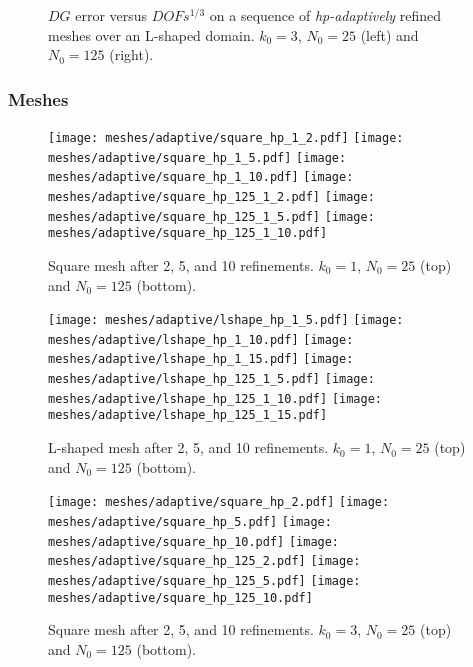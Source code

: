 \begin{figure}[!ht]
    \begin{subfigure}[b]{0.45\textwidth}
		
	\end{subfigure}
	\hfill
	\begin{subfigure}[b]{0.45\textwidth}
		
	\end{subfigure}
    \caption{$DG$ error versus $DOFs^{1/3}$ on a sequence of \textit{hp-adaptively} refined meshes over an L-shaped domain. $k_0 = 3$, $N_0 = 25$ (left) and $N_0 = 125$ (right).}
\end{figure}

\newpage
\subsubsection{Meshes}

\begin{figure}[!ht]
	\centering
    \texttt{[image: meshes/adaptive/square\_hp\_1\_2.pdf]}
	\texttt{[image: meshes/adaptive/square\_hp\_1\_5.pdf]}
	\texttt{[image: meshes/adaptive/square\_hp\_1\_10.pdf]}
    \texttt{[image: meshes/adaptive/square\_hp\_125\_1\_2.pdf]}
	\texttt{[image: meshes/adaptive/square\_hp\_125\_1\_5.pdf]}
	\texttt{[image: meshes/adaptive/square\_hp\_125\_1\_10.pdf]}
    \caption{Square mesh after 2, 5, and 10 refinements. $k_0 = 1$, $N_0 = 25$ (top) and $N_0 = 125$ (bottom).}
\end{figure}

\begin{figure}[!ht]
	\centering
	\texttt{[image: meshes/adaptive/lshape\_hp\_1\_5.pdf]}
	\texttt{[image: meshes/adaptive/lshape\_hp\_1\_10.pdf]}
	\texttt{[image: meshes/adaptive/lshape\_hp\_1\_15.pdf]}
    \texttt{[image: meshes/adaptive/lshape\_hp\_125\_1\_5.pdf]}
	\texttt{[image: meshes/adaptive/lshape\_hp\_125\_1\_10.pdf]}
	\texttt{[image: meshes/adaptive/lshape\_hp\_125\_1\_15.pdf]}
    \caption{L-shaped mesh after 2, 5, and 10 refinements. $k_0 = 1$, $N_0 = 25$ (top) and $N_0 = 125$ (bottom).}
\end{figure}

\newpage

\begin{figure}[!ht]
	\centering
    \texttt{[image: meshes/adaptive/square\_hp\_2.pdf]}
	\texttt{[image: meshes/adaptive/square\_hp\_5.pdf]}
	\texttt{[image: meshes/adaptive/square\_hp\_10.pdf]}
    \texttt{[image: meshes/adaptive/square\_hp\_125\_2.pdf]}
	\texttt{[image: meshes/adaptive/square\_hp\_125\_5.pdf]}
	\texttt{[image: meshes/adaptive/square\_hp\_125\_10.pdf]}
	\caption{Square mesh after 2, 5, and 10 refinements. $k_0 = 3$, $N_0 = 25$ (top) and $N_0 = 125$ (bottom).}
\end{figure}

